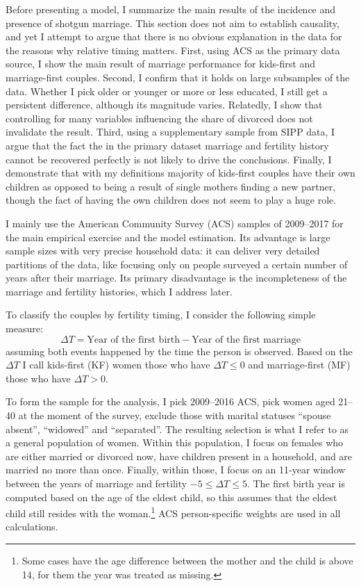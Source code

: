 \documentclass[12pt,letter]{article}
\begin{document}
Before presenting a model, I summarize the main results of the incidence and presence of shotgun marriage.  This section does not aim to establish causality, and yet I attempt to argue that there is no obvious explanation in the data for the reasons why relative timing matters. First, using ACS as the primary data source, I show the main result of marriage performance for kids-first and marriage-first couples. Second, I confirm that it holds on large subsamples of the data. Whether I pick older or younger or more or less educated, I still get a persistent difference, although its magnitude varies. Relatedly, I show that controlling for many variables influencing the share of divorced does not invalidate the result. Third, using a supplementary sample from SIPP data, I argue that the fact the in the primary dataset marriage and fertility history cannot be recovered perfectly is not likely to drive the conclusions. Finally, I demonstrate that with my definitions majority of kids-first couples have their own children as opposed to being a result of single mothers finding a new partner, though the fact of having the own children does not seem to play a huge role.

I mainly use the American Community Survey (ACS) samples of 2009--2017 for the main empirical exercise and the model estimation. Its advantage is large sample sizes with very precise household data: it can deliver very detailed partitions of the data, like focusing only on people surveyed a certain number of years after their marriage. Its primary disadvantage is the incompleteness of the marriage and fertility histories, which I address later. 

To classify the couples by fertility timing, I consider the following simple measure:
\begin{equation}
\Delta T = \text{Year of the first birth} -  \text{Year of the first marriage}
\end{equation}
assuming both events happened by the time the person is observed. Based on the $\Delta T$ I call kids-first (KF) women those who have $\Delta T \leq 0$ and marriage-first (MF) those who have $\Delta T > 0$. %

To form the sample for the analysis, I pick 2009--2016 ACS, pick women aged 21--40 at the moment of the survey, exclude those with marital statuses ``spouse absent'', ``widowed'' and ``separated''. The resulting selection is what I refer to as a general population of women. Within this population, I focus on females who are either married or divorced now, have children present in a household, and are married no more than once. Finally, within those, I focus on an 11-year window between the years of marriage and fertility $-5 \leq \Delta T \leq 5$. The first birth year is computed based on the age of the eldest child, so this assumes that the eldest child still resides with the woman.\footnote{Some cases have the age difference between the mother and the child is above 14, for them the year was treated as missing.} ACS person-specific weights are used in all calculations.
\end{document}
